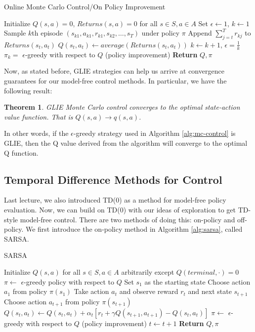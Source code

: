 \documentclass{article}
\newtheorem{theorem}{Theorem}[section]
\theoremstyle{definition}
\theoremstyle{remark}
\begin{document}
\begin{algorithm}
\caption{Online Monte Carlo Control/On Policy Improvement}\label{alg:mc-control}
\begin{algorithmic}[1]
\State Initialize $Q(s,a)=0$, $Returns(s,a) = 0$ for all $s \in S, a \in A$
\State Set $\epsilon \gets 1$, $k \gets 1$
\Loop
\State Sample $k$th episode $(s_{k1}, a_{k1}, r_{k1}, s_{k2}, \ldots, s_T)$ under policy $\pi$
\State Append $\sum_{j=t}^T r_{kj}$ to $Returns(s_t, a_t)$
\State $Q(s_t, a_t) \gets average(Returns(s_t, a_t))$
\EndIf
\EndFor
\State $k \gets k+1$, $\epsilon = \frac{1}{k}$
\State $\pi_k = $ $\epsilon$-greedy with respect to $Q$ (policy improvement)
\EndLoop
\State \textbf{Return} $Q, \pi$
\EndProcedure
\end{algorithmic}
\end{algorithm}

Now, as stated before, GLIE strategies can help us arrive at convergence guarantees for our model-free control methods.  In particular, we have the following result:

\begin{theorem}
GLIE Monte Carlo control converges to the optimal state-action value function.  That is $Q(s,a) \rightarrow q(s,a)$.
\end{theorem}

In other words, if the $\epsilon$-greedy strategy used in Algorithm \ref{alg:mc-control} is GLIE, then the Q value derived from the algorithm will converge to the optimal Q function.

\subsection{Temporal Difference Methods for Control}

Last lecture, we also introduced TD(0) as a method for model-free policy evaluation.  Now, we can build on TD(0) with our ideas of exploration to get TD-style model-free control.  There are two methods of doing this: on-policy and off-policy.  We first introduce the on-policy method in Algorithm \ref{alg:sarsa}, called SARSA.

\begin{algorithm}
\caption{SARSA}\label{alg:sarsa}
\begin{algorithmic}[1]
\State Initialize $Q(s,a)$ for all $s \in S, a \in A$ arbitrarily except $Q(terminal, \cdot) = 0$
\State $\pi \gets $ $\epsilon$-greedy policy with respect to $Q$
\State Set $s_1$ as the starting state
\State Choose action $a_1$ from policy $\pi(s_1)$
\State Take action $a_t$ and observe reward $r_t$ and next state $s_{t+1}$
\State Choose action $a_{t+1}$ from policy $\pi(s_{t+1})$
\State $Q(s_t, a_t) \gets Q(s_t, a_t) + \alpha_t [r_t+\gamma Q(s_{t+1}, a_{t+1}) - Q(s_t, a_t)]$
\State $\pi \gets$ $\epsilon$-greedy with respect to $Q$ (policy improvement)
\State $t \gets t+1$
\EndLoop
\EndFor
\State \textbf{Return} $Q, \pi$
\EndProcedure
\end{algorithmic}
\end{algorithm}
\end{document}
